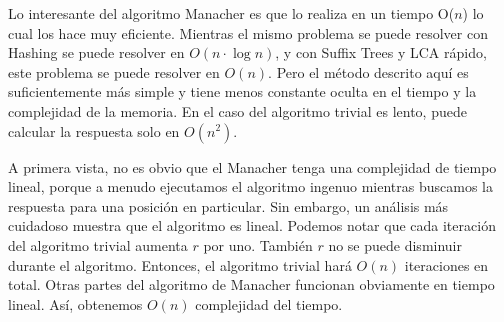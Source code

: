 Lo interesante del algoritmo Manacher es que lo realiza en un tiempo O($n$) lo cual los hace muy eficiente. Mientras el mismo problema se puede resolver con Hashing se puede resolver en $O(n\cdot\log n)$, y con Suffix Trees y LCA rápido, este problema se puede resolver en $O(n)$. Pero el método descrito aquí es suficientemente más simple y tiene menos constante oculta en el tiempo y la complejidad de la memoria. En el caso del algoritmo trivial es lento, puede calcular la respuesta solo en $O(n^2)$.

A primera vista, no es obvio que el Manacher tenga una complejidad de tiempo lineal, porque a menudo ejecutamos el algoritmo ingenuo mientras buscamos la respuesta para una posición en particular. Sin embargo, un análisis más cuidadoso muestra que el algoritmo es lineal. Podemos notar que cada iteración del algoritmo trivial aumenta $r$ por uno. También $r$ no se puede disminuir durante el algoritmo. Entonces, el algoritmo trivial hará $O(n)$ iteraciones en total. Otras partes del algoritmo de Manacher funcionan obviamente en tiempo lineal. Así, obtenemos $O(n)$ complejidad del tiempo. 